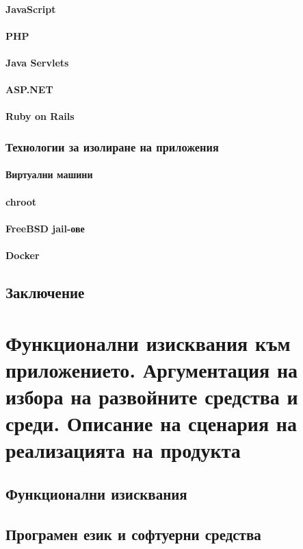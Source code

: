 \documentclass[pdftex,12pt,a4paper]{report}
\begin{document}
\subsubsection {JavaScript}
\subsubsection {PHP}
\subsubsection {Java Servlets}
\subsubsection {ASP.NET}
\subsubsection {Ruby on Rails}
\subsection {Технологии за изолиране на приложения}
\subsubsection {Виртуални машини}
\subsubsection {chroot}
\subsubsection {FreeBSD jail-ове}
\subsubsection {Docker}
\section {Заключение}
\chapter {Функционални изисквания към приложението. Аргументация на избора на развойните средства и среди. Описание на сценария на реализацията на продукта}
\section {Функционални изисквания}
\section {Програмен език и софтуерни средства}
\end{document}
